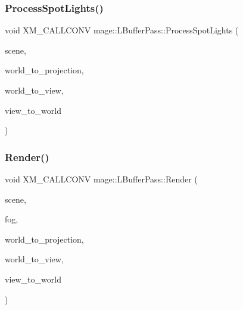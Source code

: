 \subsubsection{\texorpdfstring{Process\+Spot\+Lights()}{ProcessSpotLights()}}
{\footnotesize\ttfamily void X\+M\+\_\+\+C\+A\+L\+L\+C\+O\+NV mage\+::\+L\+Buffer\+Pass\+::\+Process\+Spot\+Lights (\begin{DoxyParamCaption}\item[{const \hyperlink{classmage_1_1_scene}{Scene} \&}]{scene,  }\item[{F\+X\+M\+M\+A\+T\+R\+IX}]{world\+\_\+to\+\_\+projection,  }\item[{C\+X\+M\+M\+A\+T\+R\+IX}]{world\+\_\+to\+\_\+view,  }\item[{C\+X\+M\+M\+A\+T\+R\+IX}]{view\+\_\+to\+\_\+world }\end{DoxyParamCaption})\hspace{0.3cm}{\ttfamily [private]}}

\hypertarget{structmage_1_1_l_buffer_pass_afae386240845baad1f35dc5358dcb096}{}\label{structmage_1_1_l_buffer_pass_afae386240845baad1f35dc5358dcb096} 
\subsubsection{\texorpdfstring{Render()}{Render()}}
{\footnotesize\ttfamily void X\+M\+\_\+\+C\+A\+L\+L\+C\+O\+NV mage\+::\+L\+Buffer\+Pass\+::\+Render (\begin{DoxyParamCaption}\item[{const \hyperlink{classmage_1_1_scene}{Scene} \&}]{scene,  }\item[{const \hyperlink{classmage_1_1_fog}{Fog} \&}]{fog,  }\item[{F\+X\+M\+M\+A\+T\+R\+IX}]{world\+\_\+to\+\_\+projection,  }\item[{C\+X\+M\+M\+A\+T\+R\+IX}]{world\+\_\+to\+\_\+view,  }\item[{C\+X\+M\+M\+A\+T\+R\+IX}]{view\+\_\+to\+\_\+world }\end{DoxyParamCaption})}

\hypertarget{structmage_1_1_l_buffer_pass_a8fc35d37df15125c8f50df9de7bf885d}{}\label{structmage_1_1_l_buffer_pass_a8fc35d37df15125c8f50df9de7bf885d} 
